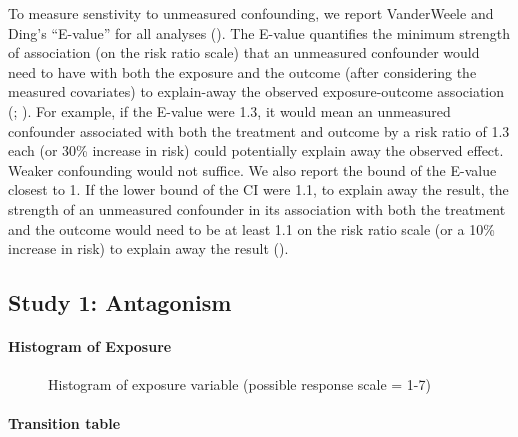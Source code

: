 \documentclass[
  singlecolumn]{article}
\let\oldparagraph\paragraph
\renewcommand{\paragraph}[1]{\oldparagraph{#1}\mbox{}}
\begin{document}
To measure senstivity to unmeasured confounding, we report VanderWeele
and Ding's ``E-value'' for all analyses
(). The E-value
quantifies the minimum strength of association (on the risk ratio scale)
that an unmeasured confounder would need to have with both the exposure
and the outcome (after considering the measured covariates) to
explain-away the observed exposure-outcome association
(;
). For
example, if the E-value were 1.3, it would mean an unmeasured confounder
associated with both the treatment and outcome by a risk ratio of 1.3
each (or 30\% increase in risk) could potentially explain away the
observed effect. Weaker confounding would not suffice. We also report
the bound of the E-value closest to 1. If the lower bound of the CI were
1.1, to explain away the result, the strength of an unmeasured
confounder in its association with both the treatment and the outcome
would need to be at least 1.1 on the risk ratio scale (or a 10\%
increase in risk) to explain away the result
().

\subsection{Study 1: Antagonism}\label{study-1-antagonism}

\paragraph{Histogram of Exposure}\label{histogram-of-exposure}

\begin{figure}


\caption{\label{fig-histogram-antagonism}Histogram of exposure variable
(possible response scale = 1-7)}

\end{figure}%

\paragraph{Transition table}\label{transition-table}
\end{document}

